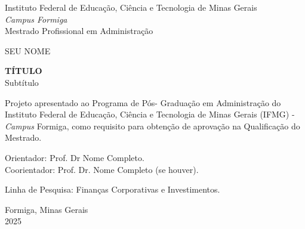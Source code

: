 
\thispagestyle{empty}

\begin{center}
    \large
    Instituto Federal de Educação, Ciência e Tecnologia de Minas Gerais \\ 
    \textit{Campus Formiga} \\
    \sc Mestrado Profissional em Administração
    
    \vspace{3cm}
    SEU NOME
    
    \vspace{3cm}
    \textbf{TÍTULO} \\
    Subtítulo
    
    \vspace{2cm}
    \begin{flushright}
    \begin{minipage}{0.6\textwidth}
    \small
    Projeto apresentado ao Programa de Pós-
    Graduação em Administração do Instituto
    Federal de Educação, Ciência e
    Tecnologia de Minas Gerais (IFMG) -
    \textit{Campus} Formiga, como requisito para
    obtenção de aprovação na Qualificação
    do Mestrado.
    \end{minipage}
    \end{flushright}
    
    \vspace{0.5cm}
    \begin{flushright}
    \small
    Orientador: Prof. Dr Nome Completo.\\
    Coorientador: Prof. Dr. Nome Completo (se houver).
    
    \vspace{0.5cm}
    Linha de Pesquisa: Finanças Corporativas e Investimentos.
    \end{flushright}
    
    \vfill
    Formiga, Minas Gerais \\
    2025
\end{center}


\newpage

\thispagestyle{empty}

\newenvironment{meuresumo}{
  \clearpage
  \small
  \vspace{-1cm}
  \begin{center}
    \bfseries RESUMO
    \vspace{0.5em}
  \end{center}
  \begin{quote}
}{
  \end{quote}
  \vspace{-1.1em}
  \begin{center}
  \begin{minipage}{0.87\textwidth} 
  \textbf{Palavras-chave:} palavra 1, palavra 2, palavra 3.
  \end{minipage}
  \end{center}
  \clearpage
}

